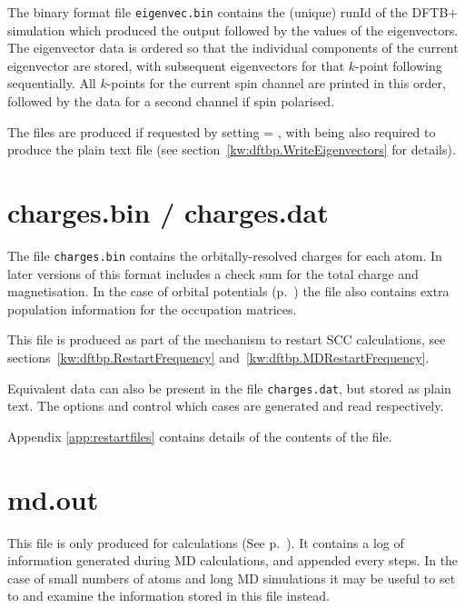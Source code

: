 The binary format file \verb|eigenvec.bin| contains the (unique) runId of the
DFTB+ simulation which produced the output followed by the values of the
eigenvectors. The eigenvector data is ordered so that the individual components
of the current eigenvector are stored, with subsequent eigenvectors for that
$k$-point following sequentially. All $k$-points for the current spin channel
are printed in this order, followed by the data for a second channel if spin
polarised.

The files are produced if requested by setting  =
, with  being also required to produce the plain
text file (see section~\ref{kw:dftbp.WriteEigenvectors} for details).

\section{charges.bin / charges.dat}
\label{sec:charges.bin}

The file \verb|charges.bin| contains the orbitally-resolved charges for each
atom. In later versions of \dftbp{} this format includes a check sum for the
total charge and magnetisation. In the case of orbital potentials
(p.~) the file also contains extra population information for
the occupation matrices.

This file is produced as part of the mechanism to restart SCC calculations, see
sections~\ref{kw:dftbp.RestartFrequency} and~\ref{kw:dftbp.MDRestartFrequency}.

Equivalent data can also be present in the file \verb|charges.dat|, but stored
as plain text. The options  and 
control which cases are generated and read respectively.

Appendix \ref{app:restartfiles} contains details of the contents of the file.

\section{md.out}
\label{sec:md.out}

This file is only produced for  calculations (See
p.~). It contains a log of information generated during MD
calculations, and appended every  steps. In the case of
small numbers of atoms and long MD simulations it may be useful to set
 to  and examine the information stored in this file
instead.

